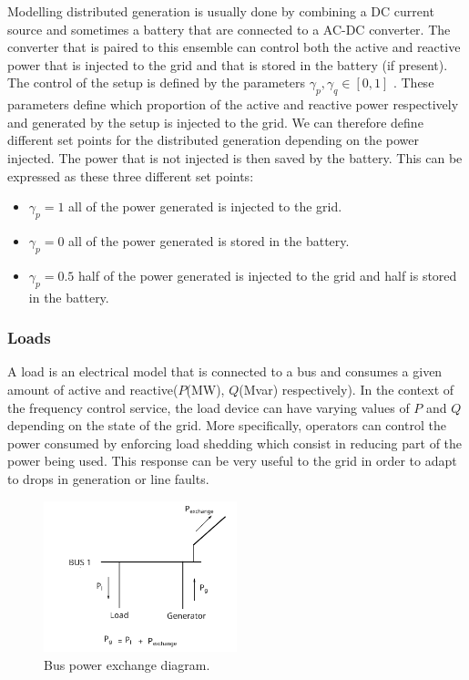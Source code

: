 \documentclass{article}
\begin{document}
Modelling distributed generation is usually done by combining a DC current source and sometimes a battery that are connected to a AC-DC converter. The converter that is paired to this ensemble can control both the active and reactive power that is injected to the grid and that is stored in the battery (if present). The control of the setup is defined by the parameters $\gamma_p, \gamma_q \in [0,1]$ . These parameters define which proportion of the active and reactive power respectively and generated by the setup is injected to the grid. We can therefore define different set points for the distributed generation depending on the power injected. The power that is not injected is then saved by the battery. This can be expressed as these three different set points:

\begin{itemize}
    \item $\gamma_p = 1$ all of the power generated is injected to the grid.
    \item $\gamma_p = 0$ all of the power generated is stored in the battery.
    \item $\gamma_p = 0.5$ half of the power generated is injected to the grid and half is stored in the battery.
\end{itemize}


\subsubsection*{Loads}

A load is an electrical model that is connected to a bus and consumes a given amount of active and reactive($P$(MW),  $Q $(Mvar) respectively). In the context of the frequency control service, the load device can have varying values of $P$ and $Q$ depending on the state of the grid. More specifically, operators can control the power consumed by enforcing load shedding which consist in reducing part of the power being used. This response can be very useful to the grid in order to adapt to drops in generation or line faults.

\begin{figure}[!htb]
    \centering
    \includegraphics[width=0.5\textwidth]{pictures/busdiagram.png}
    \caption{Bus power exchange diagram.}
    \label{pic:bus_diagram}
\end{figure} 
\end{document}
